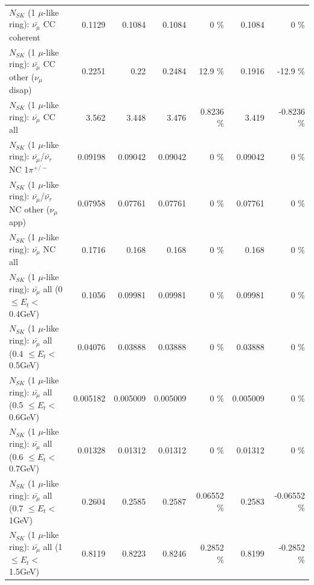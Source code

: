 \begin{table}
\begin{tabular}{| l | r | r | r  r | r  r |}
                       $N_{SK}$ (1 $\mu$-like ring): $\bar{\nu_\mu}$ CC coherent &          0.1129 &          0.1084 &          0.1084 &        0 \%  &          0.1084 &        0 \%  \\ 
        $N_{SK}$ (1 $\mu$-like ring): $\bar{\nu_\mu}$ CC other ($\nu_\mu$ disap) &          0.2251 &            0.22 &          0.2484 &     12.9 \%  &          0.1916 &    -12.9 \%  \\ 
                          $N_{SK}$ (1 $\mu$-like ring): $\bar{\nu_{\mu}}$ CC all &           3.562 &           3.448 &           3.476 &   0.8236 \%  &           3.419 &  -0.8236 \%  \\ 
\hline
  $N_{SK}$ (1 $\mu$-like ring): $\bar{\nu_\mu}$/$\bar{\nu_\tau}$ NC 1$\pi^{+/-}$ &         0.09198 &         0.09042 &         0.09042 &        0 \%  &         0.09042 &        0 \%  \\ 
$N_{SK}$ (1 $\mu$-like ring): $\bar{\nu_\mu}$/$\bar{\nu_\tau}$ NC other ($\nu_\mu$ app) &         0.07958 &         0.07761 &         0.07761 &        0 \%  &         0.07761 &        0 \%  \\ 
                          $N_{SK}$ (1 $\mu$-like ring): $\bar{\nu_{\mu}}$ NC all &          0.1716 &           0.168 &           0.168 &        0 \%  &           0.168 &        0 \%  \\ 
\hline
   $N_{SK}$ (1 $\mu$-like ring): $\bar{\nu_{\mu}}$ all (0 $\leq E_{t} <$ 0.4GeV) &          0.1056 &         0.09981 &         0.09981 &        0 \%  &         0.09981 &        0 \%  \\ 
 $N_{SK}$ (1 $\mu$-like ring): $\bar{\nu_{\mu}}$ all (0.4 $\leq E_{t} <$ 0.5GeV) &         0.04076 &         0.03888 &         0.03888 &        0 \%  &         0.03888 &        0 \%  \\ 
 $N_{SK}$ (1 $\mu$-like ring): $\bar{\nu_{\mu}}$ all (0.5 $\leq E_{t} <$ 0.6GeV) &        0.005182 &        0.005009 &        0.005009 &        0 \%  &        0.005009 &        0 \%  \\ 
 $N_{SK}$ (1 $\mu$-like ring): $\bar{\nu_{\mu}}$ all (0.6 $\leq E_{t} <$ 0.7GeV) &         0.01328 &         0.01312 &         0.01312 &        0 \%  &         0.01312 &        0 \%  \\ 
   $N_{SK}$ (1 $\mu$-like ring): $\bar{\nu_{\mu}}$ all (0.7 $\leq E_{t} <$ 1GeV) &          0.2604 &          0.2585 &          0.2587 &  0.06552 \%  &          0.2583 & -0.06552 \%  \\ 
   $N_{SK}$ (1 $\mu$-like ring): $\bar{\nu_{\mu}}$ all (1 $\leq E_{t} <$ 1.5GeV) &          0.8119 &          0.8223 &          0.8246 &   0.2852 \%  &          0.8199 &  -0.2852 \%  \\ 

\end{tabular}
\end{table}

